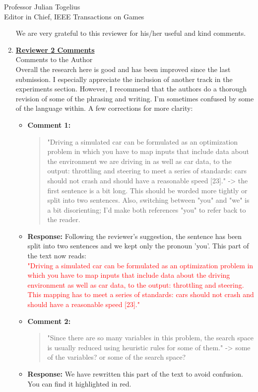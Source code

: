 \documentclass[10pt]{letter} %
\begin{document}
\begin{letter}{Professor Julian Togelius \\ Editor in Chief, IEEE Transactions on Games}
\begin{enumerate}
We are very grateful to this reviewer for his/her useful and kind comments.

\newpage


\item {\bf \underline{ Reviewer 2 Comments}}\\
	Comments to the Author\\
	Overall the research here is good and has been improved since the last submission. I especially appreciate the inclusion of another track in the experiments section.
	However, I recommend that the authors do a thorough revision of some of the phrasing and writing. I'm sometimes confused by some of the language within.
	A few corrections for more clarity:	
	\begin{itemize}			
		\item {\bf Comment 1:}
			\begin{quote}
				"Driving a simulated car can be formulated as an optimization problem in which you have to map inputs that include data about the environment we are driving in as well as car data, to the output: throttling and steering to meet a series of standards: cars should not crash and should have a reasonable speed [23]." -> the first sentence is a bit long. This should be worded more tightly or split into two sentences. Also, switching between "you" and "we" is a bit disorienting; I'd make both references "you" to refer back to the reader.
			\end{quote}	
		\item {\bf Response:} 
				Following the reviewer's suggestion, the sentence has been split into two sentences and we kept only the pronoun 'you'. This part of the text now reads: \\
			\textcolor{red}{
				"Driving a simulated car can be formulated as an optimization
				problem in which you have to map inputs that
				include data about the driving environment as well as car
				data, to the output: throttling and steering. This mapping
				has to meet a series of standards: cars should not crash
				and should have a reasonable speed [23]."}

		\item {\bf Comment 2:}
			\begin{quote}
				"Since there are so many variables in this problem, the search space is usually reduced using heuristic rules for some of them." -> some of the variables? or some of the search space?
			\end{quote}	
		\item {\bf Response:} 
		We have rewritten this part of the text to avoid confusion. You can find it highlighted in red.


\end{itemize}
\end{enumerate}
\end{letter}
\end{document}

